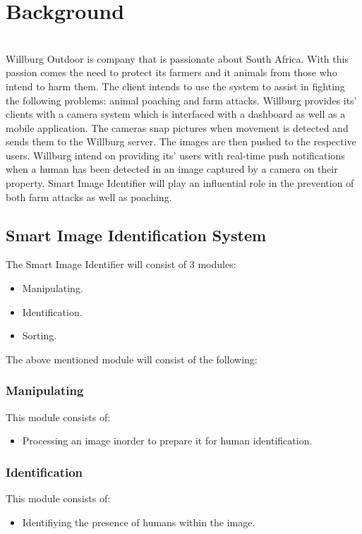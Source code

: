 \documentclass[a4paper,12pt]{report}
\begin{document}
\section {Background}
\\Willburg Outdoor is company that is passionate about South Africa. With this passion comes the need to protect its farmers and it animals from those who intend to harm them. The client intends to use the system to assist in fighting the following problems: animal poaching and farm attacks. 
Willburg provides its' clients with a camera system which is interfaced with a dashboard as well as a mobile application. The cameras snap pictures when movement is detected and sends them to the Willburg server. The images are then pushed to the respective users. Willburg intend on providing its' users with real-time push notifications when a human has been detected in an image captured by a camera on their property. Smart Image Identifier will play an influential role in the prevention of both farm attacks as well as poaching.

\subsection {Smart Image Identification System}
The Smart Image Identifier will consist of 3 modules:
	\begin {itemize}
		\item Manipulating.  
		\item Identification.
		\item Sorting.
	\end {itemize}

The above mentioned module will consist of the following:
	\subsubsection {Manipulating}
		This module consists of:
			\begin {itemize}
				\item Processing an image inorder to prepare it for human identification.
			\end {itemize}

	\subsubsection {Identification}
		This module consists of:
			\begin {itemize}
				\item Identifiying the presence of humans within the image.
			\end {itemize}
\end{document}
